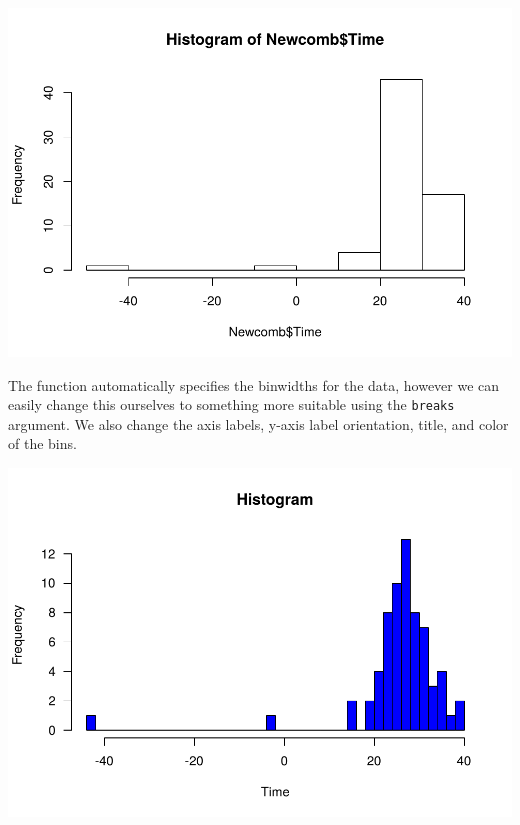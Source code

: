\documentclass[
]{krantz}
\makeatletter
\newenvironment{Shaded}{\begin{snugshade}}{\end{snugshade}}
\newcommand{\DataTypeTok}[1]{\textcolor[rgb]{0.27,0.27,0.27}{#1}}
\newcommand{\DecValTok}[1]{\textcolor[rgb]{0.06,0.06,0.06}{#1}}
\newcommand{\KeywordTok}[1]{\textcolor[rgb]{0.27,0.27,0.27}{\textbf{#1}}}
\newcommand{\NormalTok}[1]{#1}
\newcommand{\OperatorTok}[1]{\textcolor[rgb]{0.43,0.43,0.43}{\textbf{#1}}}
\newcommand{\StringTok}[1]{\textcolor[rgb]{0.5,0.5,0.5}{#1}}
\newenvironment{kframe}{%
\medskip{}
\setlength{\fboxsep}{.8em}
 \def\at@end@of@kframe{}%
 \ifinner\ifhmode%
  \def\at@end@of@kframe{\end{minipage}}%
  \begin{minipage}{\columnwidth}%
 \fi\fi%
 \def\FrameCommand##1{\hskip\@totalleftmargin \hskip-\fboxsep
 \colorbox{shadecolor}{##1}\hskip-\fboxsep
     \hskip-\linewidth \hskip-\@totalleftmargin \hskip\columnwidth}%
 \MakeFramed {\advance\hsize-\width
   \@totalleftmargin\z@ \linewidth\hsize
   \@setminipage}}%
 {\par\unskip\endMakeFramed%
 \at@end@of@kframe}
\renewenvironment{Shaded}{\begin{kframe}}{\end{kframe}}
\makeatother
\begin{document}
\includegraphics{bookdown_files/figure-latex/unnamed-chunk-352-1.pdf}

The function automatically specifies the binwidths for the data, however we can easily change this ourselves to something more suitable using the \texttt{breaks} argument. We also change the axis labels, y-axis label orientation, title, and color of the bins.

\begin{Shaded}
\end{Shaded}

\includegraphics{bookdown_files/figure-latex/unnamed-chunk-353-1.pdf}
\end{document}
